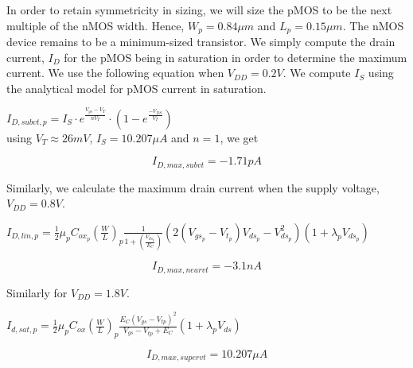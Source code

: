 \documentclass[12pt,a4paper]{article}
\begin{document}
\noindent In order to retain symmetricity in sizing, we will size the pMOS to be the next multiple of the nMOS width. Hence, $W_p = 0.84 \mu m$ and $L_p = 0.15 \mu m$. The nMOS device remains to be a minimum-sized transistor.
\newline\newline
\noindent We simply compute the drain current, $I_D$ for the pMOS being in saturation in order to determine the maximum current. We use the following equation when $V_{DD} = 0.2 V$. We compute $I_S$ using the analytical model for pMOS current in saturation.

\doublespacing
\begin{center}
    $I_{D,subvt,p} = I_S \cdot e^{\frac{V_{gs}-V_T}{nV_T}} \cdot (1-e^{\frac{-V_{DS}}{V_T}})$ \\
    using $V_T \approx 26 mV$, $I_S = 10.207 \mu A$ and $n=1$, we get
\end{center}
\singlespacing

\begin{equation}
    \label{eq:expt2-idmax-subvt}
    I_{D,max,subvt} = -1.71 pA
\end{equation}

\noindent Similarly, we calculate the maximum drain current when the supply voltage, $V_{DD} = 0.8 V$.

\doublespacing
\begin{center}
    $I_{D,lin,p} = \frac{1}{2}\mu_{p}C_{ox_p}(\frac{W}{L})_{p}\frac{1}{1+(\frac{V_{ds_p}}{E_{C}})}(2(V_{gs_p}-V_{t_p})V_{ds_p}-V_{ds_p}^2)(1+\lambda_{p} V_{ds_p})$
\end{center}
\singlespacing

\begin{equation}
    \label{eq:expt2-idmax-nearvt}
    I_{D,max,nearvt} = -3.1 nA
\end{equation}

\noindent Similarly for $V_{DD} = 1.8 V$.

\doublespacing
\begin{center}
    $I_{d,sat,p} = \frac{1}{2}\mu_{p}C_{ox}(\frac{W}{L})_{p}\frac{E_{C}(V_{gs}-V_{tp})^{2}}{V_{gs}-V_{tp}+E_{C}}(1+\lambda_{p} V_{ds})$
\end{center}
\singlespacing

\begin{equation}
    \label{eq:expt2-idmax-supervt}
    I_{D,max,supervt} = 10.207 \mu A
\end{equation}
\end{document}
